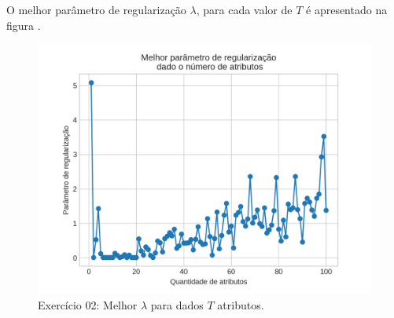\documentclass{article}
\begin{document}
    O melhor parâmetro de regularização $\lambda$, para cada valor de $T$ é apresentado na figura .
    \begin{figure}[!ht]
        \centering
        \includegraphics[width=\linewidth]{ex02/Tslambs.png}
        \caption{Exercício 02: Melhor $\lambda$ para dados $T$ atributos.}
        \label{fig:ex2_Tlamb}
    \end{figure}
 
\end{document}
